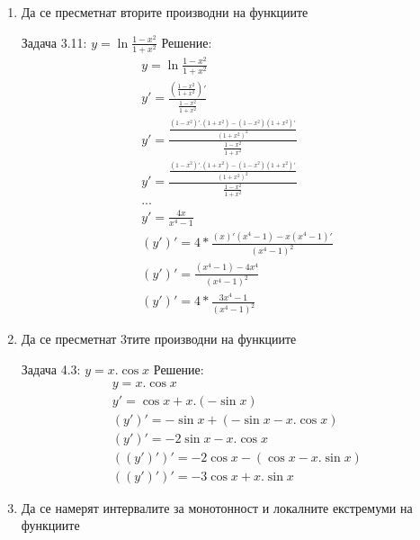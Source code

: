 \documentclass[a4paper, 20pt, fleqn, border=2pt]{article}
\begin{document}
\begin{enumerate}
    \item Да се пресметнат вторите производни на функциите
\par
\par

Задача 3.11: $y = \ln{\frac{1 - x^2}{1 + x^2}}$
Решение:
\begin{equation}
\begin{split}
    y = \ln{\frac{1 - x^2}{1 + x^2}} \\
    y' = \frac{(\frac{1 - x^2}{1 + x^2})'}{\frac{1 - x^2}{1 + x^2}} \\
    y' = \frac
    {
        \frac
        {
            (1 - x^2)'.(1 + x^2) - (1 - x^2)(1 + x^2)'
        }
        {
            (1 + x^2)^2
        }
    }
    {
        \frac{1 - x^2}{1 + x^2}
    } \\
    y' = \frac
    {
        \frac
        {
            (1 - x^2)'.(1 + x^2) - (1 - x^2)(1 + x^2)'
        }
        {
            (1 + x^2)^2
        }
    }
    {
        \frac{1 - x^2}{1 + x^2}
    } \\
    \text{...} \\
    y' = \frac{4x}{x^4 - 1} \\
    (y')' = 4*\frac{(x)'(x^4 - 1) - x(x^4 - 1)'}{(x^4 - 1)^2} \\
    (y')' = \frac{(x^4 - 1) - 4x^4}{(x^4 - 1)^2} \\ 
    (y')' = 4*\frac{3x^4 - 1}{(x^4 - 1)^2}
\end{split}
\end{equation}

    \item Да се пресметнат 3тите производни на функциите
\par
\par

Задача 4.3: $y = x.\cos{x}$
Решение:
\begin{equation}
\begin{split}
    y = x.\cos{x} \\
    y' = \cos{x} + x.(-\sin{x}) \\
    (y')' = -\sin{x} + (-\sin{x} - x.\cos{x}) \\
    (y')' = -2\sin{x} - x.\cos{x} \\
    ((y')')' = -2\cos{x} - (\cos{x} - x.\sin{x}) \\
    ((y')')' = -3\cos{x} + x.\sin{x}
\end{split}
\end{equation}

    \item Да се намерят интервалите за монотонност и локалните екстремуми на функциите
\par
\par


\end{enumerate}
\end{document}
